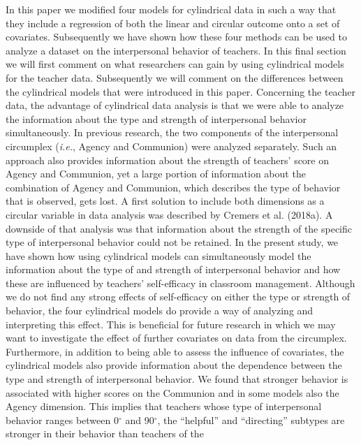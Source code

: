 \documentclass[man,mask]{apa6}
\begin{document}
In this paper we modified four models for cylindrical data in such a way that
they include a regression of both the linear and circular outcome onto a set of
covariates. Subsequently we have shown how these four methods can be used to
analyze a dataset on the interpersonal behavior of teachers. In this final
section we will first comment on what researchers can gain by using cylindrical
models for the teacher data. Subsequently we will comment on the differences
between the cylindrical models that were introduced in this paper.\newline
\indent Concerning the teacher data, the advantage of cylindrical data analysis
is that we were able to analyze the information about the type and strength of
interpersonal behavior simultaneously. In previous research, the two components
of the interpersonal circumplex (\emph{i.e.}, Agency and Communion) were
analyzed separately. Such an approach also provides information about the
strength of teachers' score on Agency and Communion, yet a large portion of
information about the combination of Agency and Communion, which describes the
type of behavior that is observed, gets lost. A first solution to include both
dimensions as a circular variable in data analysis was described by
Cremers et al. (2018a). A downside of that analysis was that information about
the strength of the specific type of interpersonal behavior could not be
retained. In the present study, we have shown how using cylindrical models can
simultaneously model the information about the type of and strength of
interpersonal behavior and how these are influenced by teachers' self-efficacy
in classroom management. Although we do not find any strong effects of
self-efficacy on either the type or strength of behavior, the four cylindrical
models do provide a way of analyzing and interpreting this effect. This is
beneficial for future research in which we may want to investigate the effect of
further covariates on data from the circumplex. \newline
\indent Furthermore, in addition to being able to assess the influence of
covariates, the cylindrical models also provide information about the dependence
between the type and strength of interpersonal behavior. We found that stronger
behavior is associated with higher scores on the Communion and in some models
also the Agency dimension. This implies that teachers whose type of
interpersonal behavior ranges between 0\(^\circ\) and 90\(^\circ\), the \enquote{helpful}
and \enquote{directing} subtypes are stronger in their behavior than teachers of the
\end{document}
